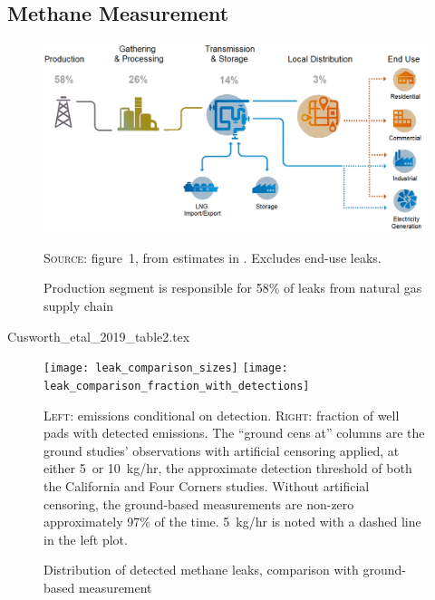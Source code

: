 \documentclass[12pt,oneside,letterpaper]{article}
\theoremstyle{definition}
\begin{document}
\begin{refsection}
\newpage
\section{Methane Measurement}
\label{app:methane-measurement}

\begin{figure}[!hbtp]
\caption{Production segment is responsible for 58\% of leaks from natural gas supply chain}
\vspace*{1\baselineskip}

\label{fig:EPA-leak-percentages-Marks}

\includegraphics[width=\textwidth]{natural_gas_leakage_percentages_marks_fig1}

\textsc{Source:} \textcite{Marks:2021} figure~1, from estimates in \textcite{Alvarez/etal:2018}.
Excludes end-use leaks.
\end{figure}

\begin{table}[!bth]
\centering
{Cusworth_etal_2019_table2.tex}
\end{table}


\begin{figure}[!bth]
\caption{Distribution of detected methane leaks, comparison with ground-based measurement}
\label{fig:app-leak-sizes}
\texttt{[image: leak\_comparison\_sizes]}
\texttt{[image: leak\_comparison\_fraction\_with\_detections]}

\textsc{Left:} emissions conditional on detection.
\textsc{Right:} fraction of well pads with detected emissions.
The ``ground cens at'' columns are the ground studies' observations with artificial censoring applied, at either 5~or 10~kg/hr, the approximate detection threshold of both the California and Four Corners studies.
Without artificial censoring, the ground-based measurements are non-zero approximately 97\% of the time.
5~kg/hr is noted with a dashed line in the left plot.


\end{figure}
\end{refsection}
\end{document}
